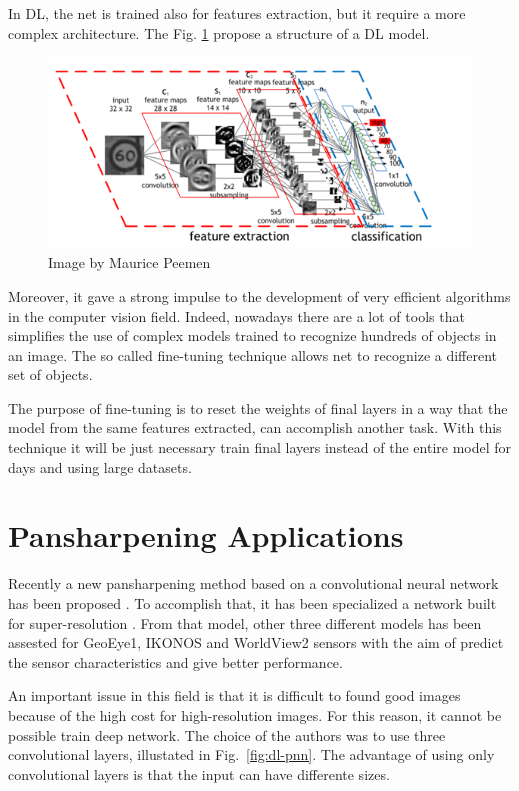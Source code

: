\documentclass[12pt]{report}
\begin{document}
In DL, the net is trained also for features extraction, but it require a more complex architecture.
The Fig. \ref{fig:dl-architecture} propose a structure of a DL model. 

\begin{figure}[t]
    \centering
    \includegraphics[scale=1.2]{dlarchitecture.png}
    \caption{Image by Maurice Peemen}
    \label{fig:dl-architecture}
\end{figure}

Moreover, it gave a strong impulse to the development of very efficient algorithms in the computer vision field. 
Indeed, nowadays there are a lot of tools that simplifies the use of complex models trained to 
recognize hundreds of objects in an image. The so called fine-tuning technique allows net to recognize a different set of objects.

The purpose of fine-tuning is to reset the weights of final layers in a way that the model from the same features extracted, can accomplish another task.
With this technique it will be just necessary train final layers instead of the entire model for days and using large datasets.


\section{Pansharpening Applications}

Recently a new pansharpening method based on a convolutional neural network has been proposed \cite{pnn}.
To accomplish that, it has been specialized a network built for super-resolution \cite{superesolution}.
From that model, other three different models has been assested for GeoEye1, IKONOS and WorldView2 sensors
with the aim of predict the sensor characteristics and give better performance. 

An important issue in this field is that it is difficult to found good images because of the high cost for high-resolution images.
For this reason, it cannot be possible train deep network. The choice of the authors was to use three convolutional layers, illustated in Fig.~\ref{fig:dl-pnn}.
The advantage of using only convolutional layers is that the input can have differente sizes.
\end{document}
